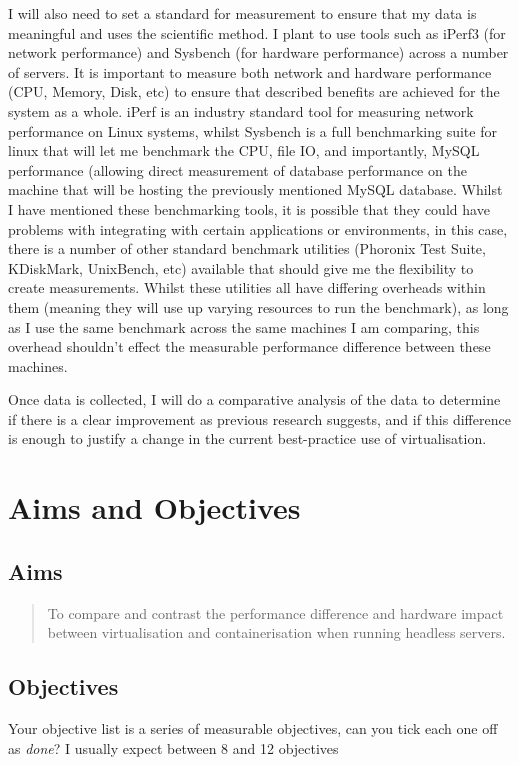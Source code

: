 I will also need to set a standard for measurement to ensure that my data is meaningful and uses the scientific method. I plant to use tools such as iPerf3 (for network performance) and Sysbench (for hardware performance) across a number of servers. It is important to measure both network and hardware performance (CPU, Memory, Disk, etc) to ensure that described  benefits are achieved for the system as a whole. iPerf is an industry standard tool for measuring network performance on Linux systems, whilst Sysbench is a full benchmarking suite for linux that will let me benchmark the CPU, file IO, and importantly, MySQL performance (allowing direct measurement of database performance on the machine that will be hosting the previously mentioned MySQL database. Whilst I have mentioned these benchmarking tools, it is possible that they could have problems with integrating with certain applications or environments, in this case, there is a number of other standard benchmark utilities (Phoronix Test Suite, KDiskMark, UnixBench, etc) available that should give me the flexibility to create measurements. Whilst these utilities all have differing overheads within them (meaning they will use up varying resources to run the benchmark), as long as I use the same benchmark across the same machines I am comparing, this overhead shouldn't effect the measurable performance difference between these machines.

Once data is collected, I will do a comparative analysis of the data to determine if there is a clear improvement as previous research suggests, and if this difference is enough to justify a change in the current best-practice use of virtualisation.

\section{Aims and Objectives}

\subsection{Aims}
\begin{quote}

To compare and contrast the performance difference and hardware impact between virtualisation and containerisation when running headless servers.

\end{quote}

\subsection{Objectives}
Your objective list is a series of measurable objectives, can you tick each one off as \emph{done}?  I usually expect between 8 and 12 objectives

